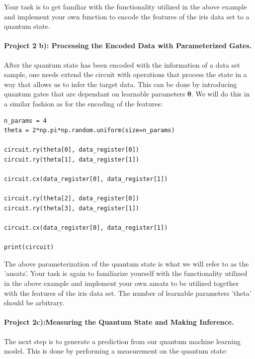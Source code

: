\documentclass[%
oneside,                 %
final,                   %
10pt]{article}
\begin{document}
Your task is to get familiar with the functionality utilized in the
above example and implement your own function to encode the
features of the iris data set to a quantum state.

\paragraph{Project 2 b): Processing the Encoded Data with Parameterized Gates.}
After the quantum state has been encoded with the information of a data set sample, one needs extend the circuit with operations that process the state in a way that allows us to infer the target data. This can be done by introducing quantum gates that are dependant on learnable parameters $\boldsymbol{\theta}$. We will do this in a similar fashion as for the encoding of the features:
















\begin{verbatim}
n_params = 4
theta = 2*np.pi*np.random.uniform(size=n_params)

circuit.ry(theta[0], data_register[0])
circuit.ry(theta[1], data_register[1])

circuit.cx(data_register[0], data_register[1])

circuit.ry(theta[2], data_register[0])
circuit.ry(theta[3], data_register[1])

circuit.cx(data_register[0], data_register[1])

print(circuit)

\end{verbatim}


The above parameterization of the quantum state is what we will refer
to as the 'ansatz'. Your task is again to familiarize yourself with
the functionality utilized in the above example and implement your own
ansatz to be utilized together with the features of the
iris data set. The number of learnable parameters 'theta'
should be arbitrary.

\paragraph{Project 2c):Measuring the Quantum State and Making Inference.}
The next step is to generate a prediction from our quantum machine learning model. This is done by performing a measurement on the quantum state:
\end{document}
